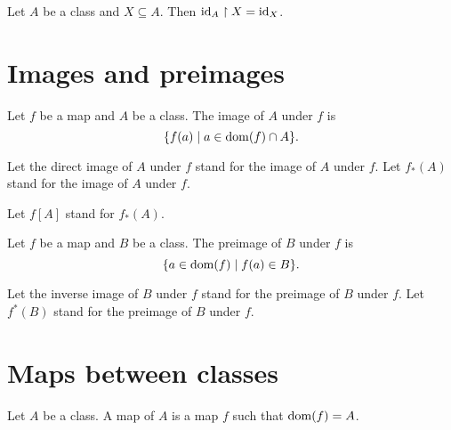 \documentclass[../../set-theory/set-theory.tex]{subfiles}
\begin{document}
  \begin{forthel}
    \begin{proposition}
      Let $A$ be a class and $X \subseteq A$.
      Then $\operatorname{id}_{A} \restriction X = \operatorname{id}_{X}$.
    \end{proposition}
  \end{forthel}


  \section{Images and preimages}

  \begin{forthel}
    \begin{definition}
      Let $f$ be a map and $A$ be a class.
      The image of $A$ under $f$ is
      \[ \{ f(a) \mid a \in \operatorname{dom}(f) \cap A \}. \]
    \end{definition}

    Let the direct image of $A$ under $f$ stand for the image of $A$ under $f$.
    Let $f_{*}(A)$ stand for the image of $A$ under $f$.

    Let $f[A]$ stand for $f_{*}(A)$.
  \end{forthel}

  \begin{forthel}
    \begin{definition}
      Let $f$ be a map and $B$ be a class.
      The preimage of $B$ under $f$ is
      \[ \{ a \in \operatorname{dom}(f) \mid f(a) \in B \}. \]
    \end{definition}

    Let the inverse image of $B$ under $f$ stand for the preimage of $B$ under
    $f$.
    Let $f^{*}(B)$ stand for the preimage of $B$ under $f$.
  \end{forthel}


  \section{Maps between classes}

  \begin{forthel}
    \begin{definition}
      Let $A$ be a class.
      A map of $A$ is a map $f$ such that $\operatorname{dom}(f) = A$.
    \end{definition}
  \end{forthel}
\end{document}
